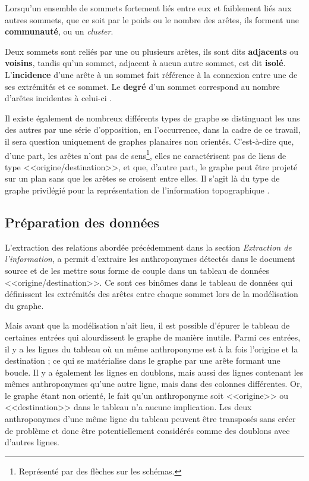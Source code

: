 Lorsqu'un ensemble de sommets fortement liés entre eux et faiblement liés aux autres sommets, que ce soit par le  poids ou le nombre  des arêtes, ils forment une \textbf{communauté}, ou un \textit{cluster}.

Deux sommets  sont reliés par une ou plusieurs arêtes, ils sont dits \textbf{adjacents} ou \textbf{voisins}, tandis qu'un sommet, adjacent à aucun autre sommet, est dit \textbf{isolé}. L'\textbf{incidence} d'une arête à un sommet fait référence à la connexion entre une de ses extrémités et ce sommet. Le \textbf{degré} d'un sommet correspond au nombre d'arêtes incidentes à celui-ci \parencite{beauguitte_graphes_2010,solnon_theorie_nodate}.

Il existe également de nombreux différents types de graphe se distinguant les uns des autres par une série d'opposition, en l'occurrence, dans la cadre de ce travail, il sera question uniquement de graphes planaires non orientés. C’est-à-dire que, d'une part, les arêtes n'ont pas de sens\footnote{Représenté par des flèches sur les schémas.}, elles ne caractérisent pas de liens de type <<origine/destination>>, et que, d'autre part, le graphe peut être projeté sur un plan sans que les arêtes se croisent entre elles. Il s'agit là du type de graphe privilégié pour la représentation de l'information topographique \parencite{beauguitte_graphes_2010}.

\subsection{Préparation des données}
L'extraction des relations abordée précédemment dans la section \textit{Extraction de l'information}, a permit d'extraire les anthroponymes détectés dans le document source et de les mettre sous forme de couple dans un tableau de données  <<origine/destination>>.
Ce sont ces binômes dans le tableau de données qui définissent les extrémités des arêtes entre chaque sommet lors de la modélisation du graphe.

Mais avant que la modélisation n'ait lieu, il est possible d'épurer le tableau de certaines entrées qui alourdissent le graphe de manière inutile. Parmi ces entrées, il y a les lignes du tableau où un même anthroponyme est à la fois l'origine et la destination ; ce qui se matérialise dans le graphe par une arête formant une boucle. Il y a également les lignes en doublons, mais aussi des lignes contenant les mêmes anthroponymes qu'une autre ligne, mais dans des colonnes différentes. Or, le graphe étant non orienté, le fait qu'un anthroponyme soit <<origine>> ou <<destination>> dans le tableau n'a aucune implication. Les deux anthroponymes d'une même ligne du tableau peuvent être transposés sans créer de problème et donc être potentiellement considérés comme des doublons avec d'autres lignes. 

